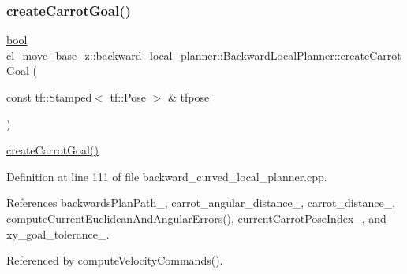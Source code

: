 \subsubsection{\texorpdfstring{create\+Carrot\+Goal()}{createCarrotGoal()}}
{\footnotesize\ttfamily \hyperlink{classbool}{bool} cl\+\_\+move\+\_\+base\+\_\+z\+::backward\+\_\+local\+\_\+planner\+::\+Backward\+Local\+Planner\+::create\+Carrot\+Goal (\begin{DoxyParamCaption}\item[{const tf\+::\+Stamped$<$ tf\+::\+Pose $>$ \&}]{tfpose }\end{DoxyParamCaption})\hspace{0.3cm}{\ttfamily [private]}}

\hyperlink{classcl__move__base__z_1_1backward__local__planner_1_1BackwardLocalPlanner_a786337a838e58b38b724bc342cf76e10}{create\+Carrot\+Goal()} 

Definition at line 111 of file backward\+\_\+curved\+\_\+local\+\_\+planner.\+cpp.



References backwards\+Plan\+Path\+\_\+, carrot\+\_\+angular\+\_\+distance\+\_\+, carrot\+\_\+distance\+\_\+, compute\+Current\+Euclidean\+And\+Angular\+Errors(), current\+Carrot\+Pose\+Index\+\_\+, and xy\+\_\+goal\+\_\+tolerance\+\_\+.



Referenced by compute\+Velocity\+Commands().


